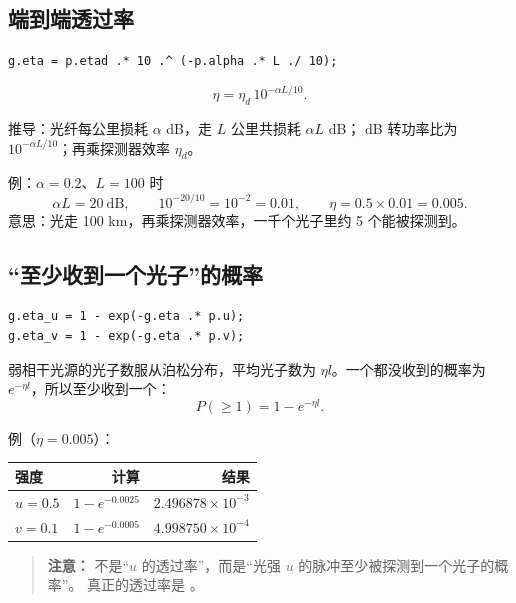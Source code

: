 \documentclass[UTF8,11pt,a4paper]{ctexart}
\newcommand{\code}[1]{\texttt{\detokenize{#1}}}
\newenvironment{note}
  {\begin{quote}\noindent\textbf{注意：}}
  {\end{quote}}
\begin{document}
\subsection{端到端透过率}

\begin{lstlisting}
g.eta = p.etad .* 10 .^ (-p.alpha .* L ./ 10);
\end{lstlisting}

\begin{equation}
\eta=\eta_d\,10^{-\alpha L/10}.
\end{equation}

推导：光纤每公里损耗 $\alpha$ dB，走 $L$ 公里共损耗 $\alpha L$ dB；
dB 转功率比为 $10^{-\alpha L/10}$；再乘探测器效率 $\eta_d$。

例：$\alpha=0.2$、$L=100$ 时
\[
\alpha L=20\ \text{dB},\qquad
10^{-20/10}=10^{-2}=0.01,\qquad
\eta=0.5\times0.01=0.005.
\]
意思：光走 100 km，再乘探测器效率，一千个光子里约 5 个能被探测到。

\subsection{“至少收到一个光子”的概率}

\begin{lstlisting}
g.eta_u = 1 - exp(-g.eta .* p.u);
g.eta_v = 1 - exp(-g.eta .* p.v);
\end{lstlisting}

弱相干光源的光子数服从泊松分布，平均光子数为 $\eta l$。一个都没收到的概率为
$e^{-\eta l}$，所以至少收到一个：
\begin{equation}
P(\ge 1)=1-e^{-\eta l}.
\end{equation}

例（$\eta=0.005$）：

\begin{center}
\begin{tabular}{@{}lrr@{}}
\toprule
强度 & 计算 & 结果\\
\midrule
$u=0.5$ & $1-e^{-0.0025}$ & $2.496878\times10^{-3}$\\
$v=0.1$ & $1-e^{-0.0005}$ & $4.998750\times10^{-4}$\\
\bottomrule
\end{tabular}
\end{center}

\begin{note}
\code{g.eta_u} 不是“$u$ 的透过率”，而是“光强 $u$ 的脉冲至少被探测到一个光子的概率”。
真正的透过率是 \code{g.eta}。
\end{note}
\end{document}
